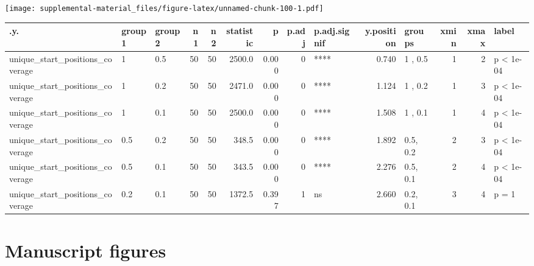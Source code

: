 \documentclass[]{book}
\begin{document}
\texttt{[image: supplemental-material\_files/figure-latex/unnamed-chunk-100-1.pdf]}

\begin{tabular}{l|l|l|r|r|r|r|r|l|r|l|r|r|l}
\hline
.y. & group1 & group2 & n1 & n2 & statistic & p & p.adj & p.adj.signif & y.position & groups & xmin & xmax & label\\
\hline
unique\_start\_positions\_coverage & 1 & 0.5 & 50 & 50 & 2500.0 & 0.000 & 0 & **** & 0.740 & 1  , 0.5 & 1 & 2 & p < 1e-04\\
\hline
unique\_start\_positions\_coverage & 1 & 0.2 & 50 & 50 & 2471.0 & 0.000 & 0 & **** & 1.124 & 1  , 0.2 & 1 & 3 & p < 1e-04\\
\hline
unique\_start\_positions\_coverage & 1 & 0.1 & 50 & 50 & 2500.0 & 0.000 & 0 & **** & 1.508 & 1  , 0.1 & 1 & 4 & p < 1e-04\\
\hline
unique\_start\_positions\_coverage & 0.5 & 0.2 & 50 & 50 & 348.5 & 0.000 & 0 & **** & 1.892 & 0.5, 0.2 & 2 & 3 & p < 1e-04\\
\hline
unique\_start\_positions\_coverage & 0.5 & 0.1 & 50 & 50 & 343.5 & 0.000 & 0 & **** & 2.276 & 0.5, 0.1 & 2 & 4 & p < 1e-04\\
\hline
unique\_start\_positions\_coverage & 0.2 & 0.1 & 50 & 50 & 1372.5 & 0.397 & 1 & ns & 2.660 & 0.2, 0.1 & 3 & 4 & p = 1\\
\hline
\end{tabular}

\hypertarget{manuscript-figures-8}{%
\section{Manuscript figures}\label{manuscript-figures-8}}
\end{document}

